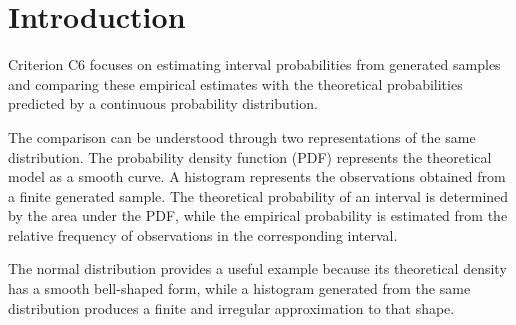 	
	\section{Introduction}\label{sec:c6-introduction}
	
	\vspace{8mm}
	
	Criterion C6 focuses on estimating interval probabilities from generated
	samples and comparing these empirical estimates with the theoretical
	probabilities predicted by a continuous probability distribution.
	
	The comparison can be understood through two representations of the same
	distribution. The probability density function (PDF) represents the
	theoretical model as a smooth curve. A histogram represents the observations
	obtained from a finite generated sample. The theoretical probability of an
	interval is determined by the area under the PDF, while the empirical
	probability is estimated from the relative frequency of observations in the
	corresponding interval.
	
	The normal distribution provides a useful example because its theoretical
	density has a smooth bell-shaped form, while a histogram generated from the
	same distribution produces a finite and irregular approximation to that
	shape.
	
	
	
